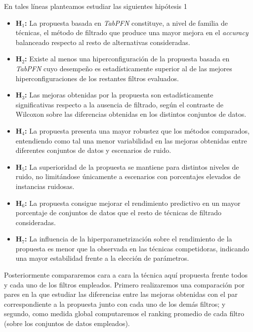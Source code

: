 \documentclass[print, color]{ugrTFG}
\begin{document}
    En tales líneas planteamos estudiar las siguientes hipótesis
1
    \begin{itemize}
    
        \item \textbf{H$_1$:} La propuesta basada en \textit{TabPFN} constituye, a nivel de familia de técnicas, el método de filtrado que produce una mayor mejora en el \textit{accuracy} balanceado respecto al resto de alternativas consideradas.
    
        \item \textbf{H$_2$:} Existe al menos una hiperconfiguración de la propuesta basada en \textit{TabPFN} cuyo desempeño es estadísticamente superior al de las mejores hiperconfiguraciones de los restantes filtros evaluados.
    
        \item \textbf{H$_3$:} Las mejoras obtenidas por la propuesta son estadísticamente significativas respecto a la ausencia de filtrado, según el contraste de Wilcoxon sobre las diferencias obtenidas en los distintos conjuntos de datos.
    
        \item \textbf{H$_4$:} La propuesta presenta una mayor robustez que los métodos comparados, entendiendo como tal una menor variabilidad en las mejoras obtenidas entre diferentes conjuntos de datos y escenarios de ruido.
    
        \item \textbf{H$_5$:} La superioridad de la propuesta se mantiene para distintos niveles de ruido, no limitándose únicamente a escenarios con porcentajes elevados de instancias ruidosas.
    
        \item \textbf{H$_6$:} La propuesta consigue mejorar el rendimiento predictivo en un mayor porcentaje de conjuntos de datos que el resto de técnicas de filtrado consideradas.
    
        \item \textbf{H$_7$:} La influencia de la hiperparametrización sobre el rendimiento de la propuesta es menor que la observada en las técnicas competidoras, indicando una mayor estabilidad frente a la elección de parámetros.
    
    \end{itemize}
    


    Posteriormente compararemos cara a cara la técnica aquí propuesta frente todos y cada uno de los filtros empleados. Primero realizaremos una comparación por pares en la que estudiar las diferencias entre las mejoras obtenidas con el par correspondiente a la propuesta junto con cada uno de los demás filtros; y segundo, como medida global computaremos el ranking promedio de cada filtro (sobre los conjuntos de datos empleados).\\
\end{document}

